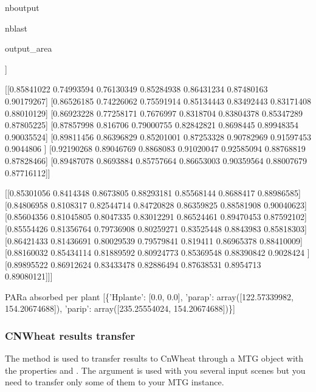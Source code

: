 \documentclass[letterpaper,10pt,english]{sphinxmanual}
\begin{document}
\begin{sphinxuseclass}{nboutput}
\begin{sphinxuseclass}{nblast}
{\begin{sphinxuseclass}{output_area}
\begin{sphinxuseclass}{}
\begin{sphinxVerbatim}[commandchars=\\\{\}]
 [[0.92296813 0.90516463 0.90284731 0.91447234 0.87371474 0.88073977
   0.93560093]
  [0.88270877 0.88940347 0.85396849 0.85397283 0.84917024 0.87384279
   0.91539319]
  [0.87898549 0.8856543  0.83203816 0.82884733 0.86532201 0.89502837
   0.90832493]
  [0.88237416 0.84629472 0.83386876 0.83964468 0.85864715 0.90311898
   0.92454761]
  [0.89126296 0.83400359 0.8388134  0.86334547 0.86850161 0.9055682
   0.93470077]
  [0.92007599 0.8866167  0.88060342 0.90901959 0.91319735 0.91664405
   0.93776939]
  [0.93967084 0.9347306  0.92625581 0.93690253 0.94524498 0.94220458
   0.9435016 ]]

 [[0.85841022 0.74993594 0.76130349 0.85284938 0.86431234 0.87480163
   0.90179267]
  [0.86526185 0.74226062 0.75591914 0.85134443 0.83492443 0.83171408
   0.88010129]
  [0.86923228 0.77258171 0.7676997  0.8318704  0.83804378 0.85347289
   0.87805225]
  [0.87857998 0.816706   0.79000755 0.82842821 0.8698445  0.89948354
   0.90035524]
  [0.89811456 0.86396829 0.85201001 0.87253328 0.90782969 0.91597453
   0.9044806 ]
  [0.92190268 0.89046769 0.8868083  0.91020047 0.92585094 0.88768819
   0.87828466]
  [0.89487078 0.8693884  0.85757664 0.86653003 0.90359564 0.88007679
   0.87716112]]

 [[0.85301056 0.8414348  0.8673805  0.88293181 0.85568144 0.8688417
   0.88986585]
  [0.84806958 0.8108317  0.82544714 0.84720828 0.86359825 0.88581908
   0.90040623]
  [0.85604356 0.81045805 0.8047335  0.83012291 0.86524461 0.89470453
   0.87592102]
  [0.85554426 0.81356764 0.79736908 0.80259271 0.83525448 0.8843983
   0.85818303]
  [0.86421433 0.81436691 0.80029539 0.79579841 0.819411   0.86965378
   0.88410009]
  [0.88160032 0.85434114 0.81889592 0.80924773 0.85369548 0.88390842
   0.9028424 ]
  [0.89895522 0.86912624 0.83433478 0.82886494 0.87638531 0.8954713
   0.89080121]]]


PARa absorbed per plant
[\{'Hplante': [0.0, 0.0], 'parap': array([122.57339982, 154.20674688]), 'parip': array([235.25554024, 154.20674688])\}]
\end{sphinxVerbatim}



\end{sphinxuseclass}
\end{sphinxuseclass}
}

\end{sphinxuseclass}
\end{sphinxuseclass}

\subsubsection{CN\sphinxhyphen{}Wheat results transfer}
\label{\detokenize{outputs_and_plantmodels_transfer:CN-Wheat-results-transfer}}
\sphinxAtStartPar
The method  is used to transfer results to Cn\sphinxhyphen{}Wheat through a MTG object with the properties  and . The  argument is used with you several input scenes but you need to transfer only some of them to your MTG instance.
\end{document}
